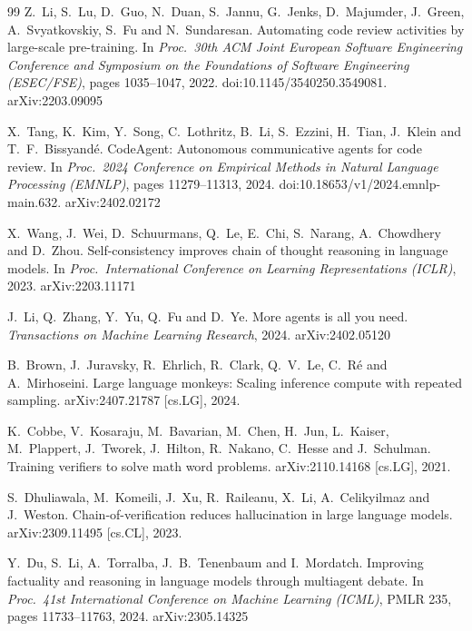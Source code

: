 \documentclass[11pt,a4paper]{article}
\begin{document}
\begin{thebibliography}{99}
Z.~Li, S.~Lu, D.~Guo, N.~Duan, S.~Jannu, G.~Jenks, D.~Majumder, J.~Green,
A.~Svyatkovskiy, S.~Fu and N.~Sundaresan.
\newblock Automating code review activities by large-scale pre-training.
\newblock In \emph{Proc.\ 30th ACM Joint European Software Engineering
Conference and Symposium on the Foundations of Software Engineering
(ESEC/FSE)}, pages 1035--1047, 2022.
\newblock doi:10.1145/3540250.3549081. arXiv:2203.09095

X.~Tang, K.~Kim, Y.~Song, C.~Lothritz, B.~Li, S.~Ezzini, H.~Tian, J.~Klein
and T.~F.~Bissyand\'e.
\newblock CodeAgent: Autonomous communicative agents for code review.
\newblock In \emph{Proc.\ 2024 Conference on Empirical Methods in Natural
Language Processing (EMNLP)}, pages 11279--11313, 2024.
\newblock doi:10.18653/v1/2024.emnlp-main.632. arXiv:2402.02172

X.~Wang, J.~Wei, D.~Schuurmans, Q.~Le, E.~Chi, S.~Narang, A.~Chowdhery and
D.~Zhou.
\newblock Self-consistency improves chain of thought reasoning in language
models.
\newblock In \emph{Proc.\ International Conference on Learning
Representations (ICLR)}, 2023. arXiv:2203.11171

J.~Li, Q.~Zhang, Y.~Yu, Q.~Fu and D.~Ye.
\newblock More agents is all you need.
\newblock \emph{Transactions on Machine Learning Research}, 2024.
arXiv:2402.05120

B.~Brown, J.~Juravsky, R.~Ehrlich, R.~Clark, Q.~V.~Le, C.~R\'e and
A.~Mirhoseini.
\newblock Large language monkeys: Scaling inference compute with repeated
sampling.
\newblock arXiv:2407.21787 [cs.LG], 2024.

K.~Cobbe, V.~Kosaraju, M.~Bavarian, M.~Chen, H.~Jun, L.~Kaiser,
M.~Plappert, J.~Tworek, J.~Hilton, R.~Nakano, C.~Hesse and J.~Schulman.
\newblock Training verifiers to solve math word problems.
\newblock arXiv:2110.14168 [cs.LG], 2021.

S.~Dhuliawala, M.~Komeili, J.~Xu, R.~Raileanu, X.~Li, A.~Celikyilmaz and
J.~Weston.
\newblock Chain-of-verification reduces hallucination in large language
models.
\newblock arXiv:2309.11495 [cs.CL], 2023.

Y.~Du, S.~Li, A.~Torralba, J.~B.~Tenenbaum and I.~Mordatch.
\newblock Improving factuality and reasoning in language models through
multiagent debate.
\newblock In \emph{Proc.\ 41st International Conference on Machine Learning
(ICML)}, PMLR 235, pages 11733--11763, 2024. arXiv:2305.14325


\end{thebibliography}
\end{document}
